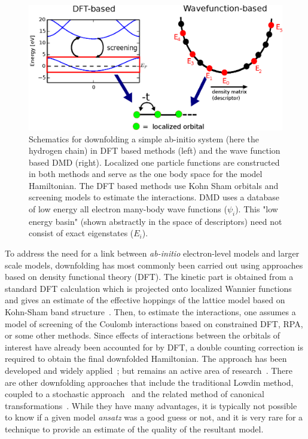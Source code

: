 \begin{figure}
\centering
\includegraphics[width=1\linewidth]{./Figures/figure1.eps}
\caption{Schematics for downfolding a simple ab-initio system (here the hydrogen chain) in DFT based methods (left) and the wave function based DMD (right). 
Localized one particle functions are constructed in both methods and serve as the one body space for the model Hamiltonian. 
The DFT based methods use Kohn Sham orbitals and screening models to estimate the interactions. 
DMD uses a database of low energy all electron many-body wave functions ($\psi_i$). 
This "low energy basin" (shown abstractly in the space of descriptors) need not consist of exact eigenstates ($E_i$).}
\label{fig:lowenergybasin_schematic}
\end{figure}	


To address the need for a link between {\it ab-initio} electron-level models and larger scale models, downfolding has most commonly been carried out using approaches based on density functional theory (DFT). 
The kinetic part is obtained from a standard DFT calculation which is projected onto localized Wannier functions and gives an estimate of the effective hoppings of the lattice model based on Kohn-Sham band structure~\cite{Pavirini}. 
Then, to estimate the interactions, one assumes a model of screening of the Coulomb interactions based on constrained DFT, RPA, or some other methods. 
Since effects of interactions between the orbitals of interest have already been accounted for by DFT, a double counting correction is required to obtain the final downfolded Hamiltonian. 
The approach has been developed and widely applied~\cite{}; but remains an active area of research~\cite{Haule_doublecounting}.
There are other downfolding approaches that include the traditional Lowdin method, coupled to a stochastic approach~\cite{Tenno,Zhou_Ceperley} and the related method of canonical transformations~\cite{White_CT, Yanai_CT}. 
While they have many advantages, it is typically not possible to know if a given model {\it ansatz} was a good guess or not, and it is very rare for a technique to provide an estimate of the quality of the resultant model. 

